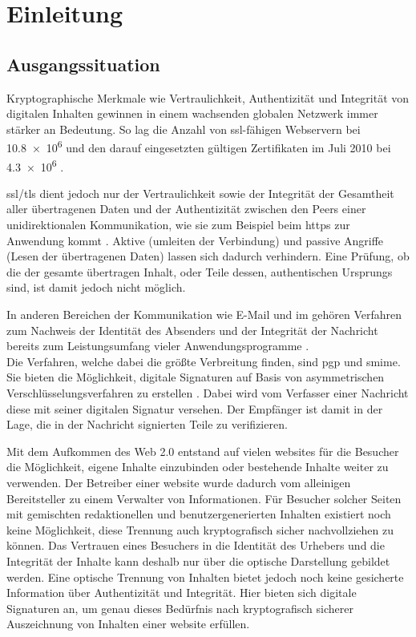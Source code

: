 
\chapter{Einleitung}
%
\label{chap:Einleitung}

\section{Ausgangssituation}
%
\label{sec:Einleitung:ausgangssituation}
Kryptographische Merkmale wie Vertraulichkeit, Authentizität und Integrität von digitalen Inhalten gewinnen in einem wachsenden globalen Netzwerk immer
stärker an Bedeutung. So lag die Anzahl von \gls{ssl}-fähigen Webservern bei \num{10.8e6} und den darauf eingesetzten gültigen Zertifikaten im Juli 2010 bei
\num{4.3e6} \cite{ssliverse:eff}.

\gls{ssl}/\gls{tls} dient jedoch nur der Vertraulichkeit sowie der Integrität der Gesamtheit aller übertragenen Daten und der Authentizität zwischen den Peers einer unidirektionalen
Kommunikation, wie sie zum Beispiel beim \gls{https} zur Anwendung kommt \cite{kits}. Aktive (umleiten der Verbindung) und passive Angriffe (Lesen der übertragenen Daten)
lassen sich dadurch verhindern. Eine Prüfung, ob die der gesamte übertragen Inhalt, oder Teile dessen, authentischen Ursprungs sind, ist damit jedoch nicht
möglich.

In anderen Bereichen der Kommunikation wie E-Mail und \gls{im} gehören Verfahren zum Nachweis der Identität des Absenders und der Integrität der Nachricht
bereits zum Leistungsumfang vieler Anwendungsprogramme \cite{2719799020071101}.\\
Die Verfahren, welche dabei die größte Verbreitung finden, sind \gls{pgp} und \gls{smime}. Sie bieten die Möglichkeit, digitale Signaturen auf Basis von asymmetrischen
Verschlüsselungsverfahren zu erstellen \cite{kits}. Dabei wird vom Verfasser einer Nachricht diese mit seiner digitalen Signatur versehen. Der Empfänger ist damit
in der Lage, die in der Nachricht signierten Teile zu verifizieren.

Mit dem Aufkommen des Web 2.0 entstand auf vielen \glspl{website} für die Besucher die Möglichkeit, eigene Inhalte einzubinden oder bestehende Inhalte weiter zu
verwenden. Der Betreiber einer \gls{website} wurde dadurch vom alleinigen Bereitsteller zu einem Verwalter von Informationen. Für Besucher solcher Seiten mit
gemischten redaktionellen und benutzergenerierten Inhalten existiert noch keine Möglichkeit, diese Trennung auch kryptografisch sicher nachvollziehen zu können.
Das Vertrauen eines Besuchers in die Identität des Urhebers und die Integrität der Inhalte kann deshalb nur über die optische Darstellung gebildet werden. Eine
optische Trennung von Inhalten bietet jedoch noch keine gesicherte Information über Authentizität und Integrität. Hier bieten sich digitale Signaturen  an, um
genau dieses Bedürfnis nach kryptografisch sicherer Auszeichnung von Inhalten einer \gls{website} erfüllen.

